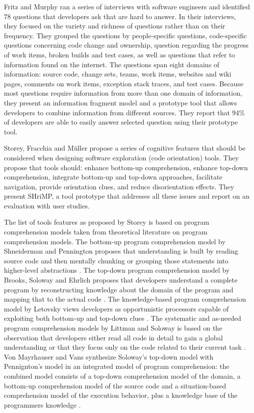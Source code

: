 Fritz and Murphy \cite{Frit10a} ran a series of interviews with software engineers and identified 78 questions that developers ask that are hard to answer. In their interviews, they focused on the variety and richness of questions rather than on their frequency. They grouped the questions by people-specific questions, code-specific questions concerning code change and ownership, question regarding the progress of work items, broken builds and test cases, as well as questions that refer to information found on the internet. 
The questions span eight domains of information: source code, change sets, teams, work items, websites and wiki pages, comments on work items, exception stack traces, and test cases. Because most questions require information from more than one domain of information, they present an information fragment model and a prototype tool that allows developers to combine information from different sources. They report that 94\% of developers are able to easily answer selected question using their prototype tool.

Storey, Fracchia and M\"uller \cite{Stor99a} propose a series of cognitive features that should be considered when designing software exploration (\ie code orientation) tools. They propose that tools should: enhance bottom-up comprehension, enhance top-down comprehension, integrate bottom-up and top-down approaches, facilitate navigation, provide orientation clues, and reduce disorientation effects. They present SHriMP, a tool prototype that addresses all these issues and report on an evaluation with user studies. 

The list of tools features as proposed by Storey \etal is based on program comprehension models taken from theoretical literature on program comprehension models.
%
The bottom-up program comprehension model by Shneiderman and Pennington proposes that understanding is built by reading source code and then mentally chunking  or grouping those statements into higher-level abstractions \cite{Shne80a,Penn87b}. 
%
The top-down program comprehension model by Brooks, Soloway and Ehrlich proposes that developers understand a complete program by reconstructing knowledge about the domain of the program and mapping that to the actual code \cite{Broo83b, Solo86a}. 
% 
The knowledge-based program comprehension model by Letovsky views developers as opportunistic processors capable of exploiting both bottom-up and top-down clues \cite{Leto86a}. 
%
The systematic and as-needed program comprehension models by Littman and Soloway is based on the  observation that developers either read all code in detail to gain a global understanding or that they focus only on the code related to their current task \cite{Litt86a}.
%
Von Mayrhauser and Vans synthesize Soloway's top-down model with Pennignton's model in an integrated model of program comprehension: the combined model consists of a top-down comprehension model of the domain, a bottom-up comprehension model of the source code and a situation-based comprehension model of the execution behavior, plus a knowledge base of the programmers knowledge \cite{Mayr94a}. 

